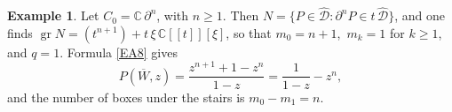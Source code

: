\documentclass[11pt,reqno]{amsart}
\theoremstyle{plain}
\theoremstyle{definition}
\newtheorem{example}{Example}[section]
\theoremstyle{remark}
\numberwithin{equation}{section}
\newcommand{\cD}{\mathcal{D}}
\newcommand{\C}{\mathbb{C}}
\newcommand{\del}{\partial}
\newcommand{\hD}{\widehat{\cD}}
\DeclareMathOperator{\gr}{gr}
\begin{document}
\begin{example}
Let $C_0 = \C\, \del^n$, with $n \ge 1$. Then $N = \{P \in \hD : \del^n P \in t\, \hD\}$, and one finds
$\gr N = (t^{n+1}) + t\, \xi\, \C[[t]][\xi]$, so that $m_0 = n + 1$, $\,m_k = 1$ for $k \ge 1$, and
$q = 1$. Formula \eqref{EA8} gives
\[
  P(\overline{W}, z) = \frac{z^{n+1}+1-z^n}{1-z}
  = \frac{1}{1-z}-z^n ,
\]
and the number of boxes under the stairs is $m_0 - m_1 = n$.
\end{example}

%


\end{document}

